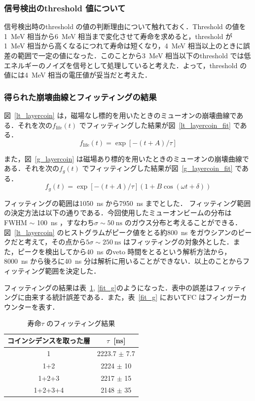 \subsubsection{信号検出のthreshold 値について}
信号検出時のthreshold の値の判断理由について触れておく．Threshold の値を1~MeV 相当から6~MeV 相当まで変化させて寿命を求めると，threshold が1~MeV 相当から高くなるにつれて寿命は短くなり，4~MeV 相当以上のときに誤差の範囲で一定の値になった．このことから3~MeV 相当以下のthreshold では低エネルギーのノイズを信号として処理していると考えた．よって，threshold の値には4~MeV 相当の電圧値が妥当だと考えた．

\subsubsection{得られた崩壊曲線とフィッティングの結果}
図~\ref{lt_layercoin} は，磁場なし標的を用いたときのミューオンの崩壊曲線である．それを次の$f_{\mathrm{life}}(t)$ でフィッティングした結果が図~\ref{lt_layercoin_fit} である．
\[f_{\mathrm{life}}(t) = \exp[-(t+A)/\tau]\]

また，図~\ref{g_layercoin} は磁場あり標的を用いたときのミューオンの崩壊曲線である．それを次の$f_{g}(t)$ でフィッティングした結果が図~\ref{g_layercoin_fit} である．
\[f_{g}(t) = \exp[-(t+A)/\tau](1+B\cos(\omega t + \delta))\]

  
フィッティングの範囲は1050~ns から7950~ns までとした． フィッティング範囲の決定方法は以下の通りである．今回使用したミューオンビームの分布はFWHM $\sim$ 100~ns ，すなわち$\sigma \sim 50~\mathrm{ns}$ のガウス分布と考えることができる．図~\ref{lt_layercoin} のヒストグラムがピーク値をとる約800~ns をガウシアンのピークだと考えて，その点から$5\sigma \sim 250~\mathrm{ns}$ はフィッティングの対象外とした．また，ピークを検出してから40~ns のveto 時間をとるという解析方法から，8000~ns から後ろに40~ns 分は解析に用いることができない．以上のことからフィッティング範囲を決定した．
  
フィッティングの結果は表~\ref{fit_lt}, \ref{fit_g}のようになった．表中の誤差はフィッティングに由来する統計誤差である．また，表~\ref{fit_g} においてFC はフィンガーカウンターを表す．
  
\begin{table}[H]
\caption{寿命$\tau$ のフィッティング結果}
\label{fit_lt}
\centering
\begin{tabular}{cc}\toprule
コインシデンスを取った層& $\tau$~[ns] \\ \midrule
1 & 2223.7 $\pm$ 7.7 \\
1+2 & 2224 $\pm$ 10 \\
1+2+3 & 2217 $\pm$ 15 \\
1+2+3+4 & 2148 $\pm$ 35\\ \bottomrule
\end{tabular}
\end{table}%
  
